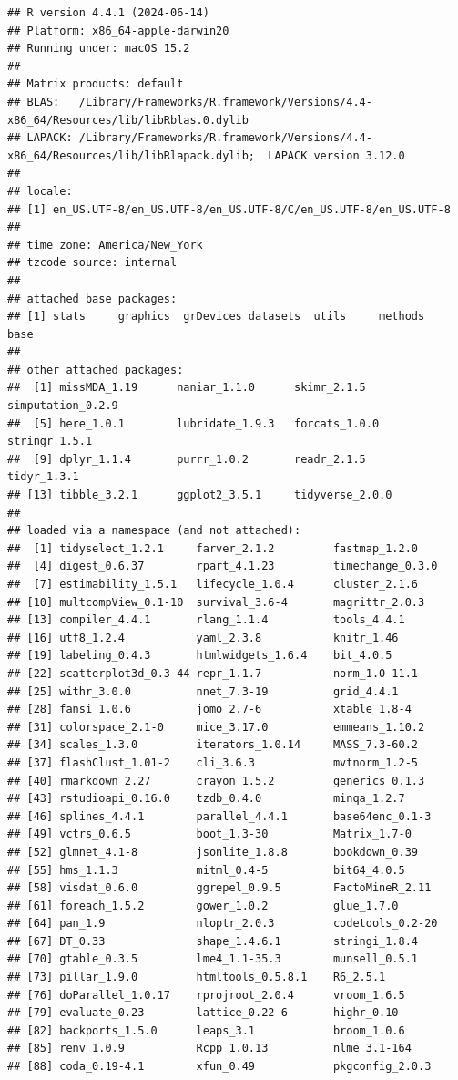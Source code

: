 \documentclass[
]{book}
\begin{document}
\begin{verbatim}
## R version 4.4.1 (2024-06-14)
## Platform: x86_64-apple-darwin20
## Running under: macOS 15.2
## 
## Matrix products: default
## BLAS:   /Library/Frameworks/R.framework/Versions/4.4-x86_64/Resources/lib/libRblas.0.dylib 
## LAPACK: /Library/Frameworks/R.framework/Versions/4.4-x86_64/Resources/lib/libRlapack.dylib;  LAPACK version 3.12.0
## 
## locale:
## [1] en_US.UTF-8/en_US.UTF-8/en_US.UTF-8/C/en_US.UTF-8/en_US.UTF-8
## 
## time zone: America/New_York
## tzcode source: internal
## 
## attached base packages:
## [1] stats     graphics  grDevices datasets  utils     methods   base     
## 
## other attached packages:
##  [1] missMDA_1.19      naniar_1.1.0      skimr_2.1.5       simputation_0.2.9
##  [5] here_1.0.1        lubridate_1.9.3   forcats_1.0.0     stringr_1.5.1    
##  [9] dplyr_1.1.4       purrr_1.0.2       readr_2.1.5       tidyr_1.3.1      
## [13] tibble_3.2.1      ggplot2_3.5.1     tidyverse_2.0.0  
## 
## loaded via a namespace (and not attached):
##  [1] tidyselect_1.2.1     farver_2.1.2         fastmap_1.2.0       
##  [4] digest_0.6.37        rpart_4.1.23         timechange_0.3.0    
##  [7] estimability_1.5.1   lifecycle_1.0.4      cluster_2.1.6       
## [10] multcompView_0.1-10  survival_3.6-4       magrittr_2.0.3      
## [13] compiler_4.4.1       rlang_1.1.4          tools_4.4.1         
## [16] utf8_1.2.4           yaml_2.3.8           knitr_1.46          
## [19] labeling_0.4.3       htmlwidgets_1.6.4    bit_4.0.5           
## [22] scatterplot3d_0.3-44 repr_1.1.7           norm_1.0-11.1       
## [25] withr_3.0.0          nnet_7.3-19          grid_4.4.1          
## [28] fansi_1.0.6          jomo_2.7-6           xtable_1.8-4        
## [31] colorspace_2.1-0     mice_3.17.0          emmeans_1.10.2      
## [34] scales_1.3.0         iterators_1.0.14     MASS_7.3-60.2       
## [37] flashClust_1.01-2    cli_3.6.3            mvtnorm_1.2-5       
## [40] rmarkdown_2.27       crayon_1.5.2         generics_0.1.3      
## [43] rstudioapi_0.16.0    tzdb_0.4.0           minqa_1.2.7         
## [46] splines_4.4.1        parallel_4.4.1       base64enc_0.1-3     
## [49] vctrs_0.6.5          boot_1.3-30          Matrix_1.7-0        
## [52] glmnet_4.1-8         jsonlite_1.8.8       bookdown_0.39       
## [55] hms_1.1.3            mitml_0.4-5          bit64_4.0.5         
## [58] visdat_0.6.0         ggrepel_0.9.5        FactoMineR_2.11     
## [61] foreach_1.5.2        gower_1.0.2          glue_1.7.0          
## [64] pan_1.9              nloptr_2.0.3         codetools_0.2-20    
## [67] DT_0.33              shape_1.4.6.1        stringi_1.8.4       
## [70] gtable_0.3.5         lme4_1.1-35.3        munsell_0.5.1       
## [73] pillar_1.9.0         htmltools_0.5.8.1    R6_2.5.1            
## [76] doParallel_1.0.17    rprojroot_2.0.4      vroom_1.6.5         
## [79] evaluate_0.23        lattice_0.22-6       highr_0.10          
## [82] backports_1.5.0      leaps_3.1            broom_1.0.6         
## [85] renv_1.0.9           Rcpp_1.0.13          nlme_3.1-164        
## [88] coda_0.19-4.1        xfun_0.49            pkgconfig_2.0.3
\end{verbatim}
\end{document}
